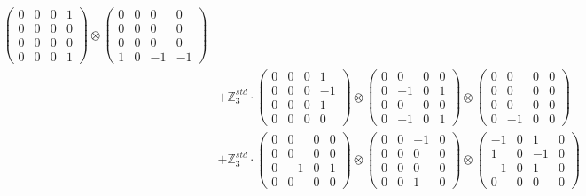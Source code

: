 \documentclass{article}
\begin{document}
{\begin{align}
            \begin{pmatrix} 0 & 0 & 0 & 1 \\ 0 & 0 & 0 & 0 \\ 0 & 0 & 0 & 0 \\ 0 & 0 & 0 & 1 \end{pmatrix} \otimes 
            \begin{pmatrix} 0 & 0 & 0 & 0 \\ 0 & 0 & 0 & 0 \\ 0 & 0 & 0 & 0 \\ 1 & 0 & -1 & -1 \end{pmatrix} \\ 
        &+ \label{Rs13-Rc12-Solution-1-c21} \mathbb{Z}_3^{std} \cdot 
            \begin{pmatrix} 0 & 0 & 0 & 1 \\ 0 & 0 & 0 & -1 \\ 0 & 0 & 0 & 1 \\ 0 & 0 & 0 & 0 \end{pmatrix} \otimes 
            \begin{pmatrix} 0 & 0 & 0 & 0 \\ 0 & -1 & 0 & 1 \\ 0 & 0 & 0 & 0 \\ 0 & -1 & 0 & 1 \end{pmatrix} \otimes 
            \begin{pmatrix} 0 & 0 & 0 & 0 \\ 0 & 0 & 0 & 0 \\ 0 & 0 & 0 & 0 \\ 0 & -1 & 0 & 0 \end{pmatrix} \\ 
        &+ \label{Rs13-Rc12-Solution-1-c22} \mathbb{Z}_3^{std} \cdot 
            \begin{pmatrix} 0 & 0 & 0 & 0 \\ 0 & 0 & 0 & 0 \\ 0 & -1 & 0 & 1 \\ 0 & 0 & 0 & 0 \end{pmatrix} \otimes 
            \begin{pmatrix} 0 & 0 & -1 & 0 \\ 0 & 0 & 0 & 0 \\ 0 & 0 & 0 & 0 \\ 0 & 0 & 1 & 0 \end{pmatrix} \otimes 
            \begin{pmatrix} -1 & 0 & 1 & 0 \\ 1 & 0 & -1 & 0 \\ -1 & 0 & 1 & 0 \\ 0 & 0 & 0 & 0 \end{pmatrix} \\ 

\end{align}}
\end{document}
